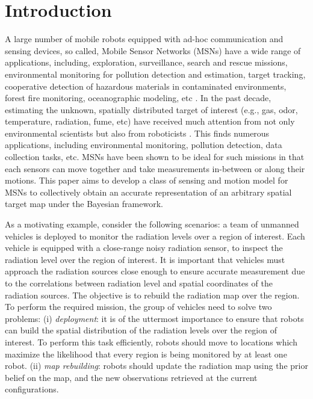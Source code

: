 \documentclass[journal]{IEEEtran}
\begin{document}
\section{Introduction}
\label{sec:sec1}
A large number of mobile robots equipped with ad-hoc communication and sensing devices, so called, Mobile Sensor Networks (MSNs) have a wide range of applications, including, exploration, surveillance, search and rescue missions, environmental
monitoring for pollution detection and estimation, target tracking, cooperative detection of hazardous materials in contaminated environments, forest fire monitoring, oceanographic modeling, etc \cite{dhillon2003sensor,howard2002mobile,cortes_coverage_2004,yu2005real}. In the past decade, estimating the unknown, spatially distributed target of interest (e.g., gas, odor, temperature, radiation, fume, etc) have received much attention from not only environmental scientists \cite{chuvieco1996mapping} but also from roboticists \cite{cortez2008smart,choi2010continuous,ristic2010information}. This finds numerous applications, including environmental monitoring, pollution detection, data collection tasks, etc.
MSNs have been shown to be ideal for such missions in that each sensors can move together and take measurements in-between or along their motions.
This paper aims to develop a class of sensing and motion model for MSNs to collectively obtain an accurate representation of an arbitrary spatial target map under the Bayesian framework.

As a motivating example, consider the following scenarios: a team of unmanned vehicles is deployed to monitor the radiation levels over a region of interest. Each vehicle is equipped with a close-range noisy radiation sensor, to inspect the radiation level over the region of interest. It is important that vehicles must approach the radiation sources close enough to ensure accurate measurement due to the correlations between radiation level and spatial coordinates of the radiation sources. The objective is to rebuild the radiation map over the region.
To perform the required mission, the group of vehicles need to solve two problems: (i) \emph{deployment}: it is of the uttermost importance to ensure that robots can build the spatial distribution of the radiation levels over the region of interest. To perform this task efficiently, robots should move to locations which 
maximize the likelihood that every region is being monitored by at least one robot. 
(ii) \emph{map rebuilding}: robots should update the radiation map using the prior belief on the map, and the new observations retrieved at the current configurations. 
\end{document}
